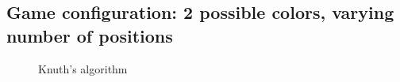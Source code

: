 \documentclass[11pt]{article}
\begin{document}
\newpage

\subsection*{Game configuration: 2 possible colors, varying number of positions}

\begin{figure}[h!]
\centering
{}
\caption{Knuth's algorithm}
\label{fig:knuth2}
\end{figure}
\end{document}
